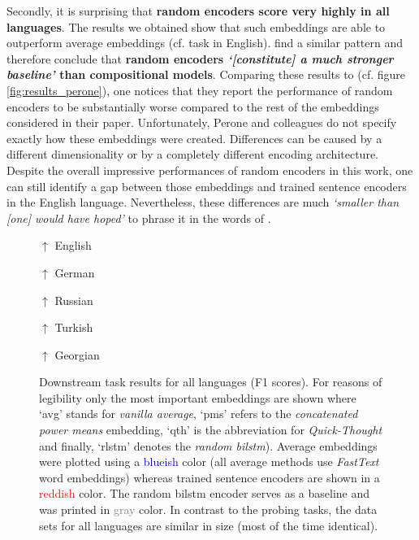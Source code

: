 Secondly, it is surprising that \textbf{random encoders score very highly in all languages}. The results we obtained show that such embeddings are able to outperform average embeddings (cf.  task in English). \citep{Wieting.2019} find a similar pattern and therefore conclude that \textbf{random encoders \textit{`[constitute] a much stronger baseline'} than compositional models}. Comparing these results to \citep{Perone.2018} (cf. figure \vref{fig:results_perone}), one notices that they report the performance of random encoders to be substantially worse compared to the rest of the embeddings considered in their paper. Unfortunately, Perone and colleagues do not specify exactly how these embeddings were created. Differences can be caused by a different dimensionality or by a completely different encoding architecture. Despite the overall impressive performances of random encoders in this work, one can still identify a gap between those embeddings and trained sentence encoders in the English language. Nevertheless, these differences are much \textit{`smaller than [one] would have hoped'} to phrase it in the words of \citep{Wieting.2019}.

\begin{figure}

\begin{center}
$\uparrow$ English
\end{center}

\begin{center}
$\uparrow$ German
\end{center}

\begin{center}
$\uparrow$ Russian
\end{center}

\begin{center}
$\uparrow$ Turkish
\end{center}

\begin{center}
$\uparrow$ Georgian
\end{center}
\caption[Downstream task results for all languages (F1 scores)]{Downstream task results for all languages (F1 scores). For reasons of legibility only the most important embeddings are shown where `avg' stands for \textit{vanilla average}, `pms' refers to the \textit{concatenated power means} embedding, `qth' is the abbreviation for \textit{Quick-Thought} and finally, `rlstm' denotes the \textit{random \gls{bilstm}}). Average embeddings were plotted using a \textcolor{blue}{blueish} color (all average methods use \textit{FastText} word embeddings) whereas trained sentence encoders are shown in a \textcolor{red}{reddish} color. The random \gls{bilstm} encoder serves as a baseline and was printed in \textcolor{gray}{gray} color. In contrast to the probing tasks, the data sets for all languages are similar in size (most of the time identical).}
\label{fig:results_downstream_tasks}
\end{figure}

